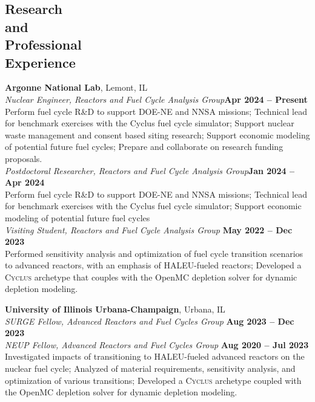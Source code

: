\documentclass[margin,line]{resume}
\newcommand{\Cyclus}{\textsc{Cyclus}\xspace}%
\begin{document}
\begin{resume}
    \section{\mysidestyle Research\\and\\Professional\\Experience}
    \textbf{Argonne National Lab}, Lemont, IL \vspace{1mm}\\
                \textsl{Nuclear Engineer, Reactors and Fuel Cycle Analysis Group}\hfill \textbf{Apr 2024 -- Present}\\
                Perform fuel cycle R\&D to support DOE-NE and NNSA missions; Technical lead for 
                benchmark exercises with 
                the Cyclus fuel cycle simulator; Support nuclear waste management and consent based 
                siting research; Support economic modeling of potential future 
                fuel cycles; Prepare and collaborate on research funding proposals. \vspace{2mm}\\                
                \textsl{Postdoctoral Researcher, Reactors and Fuel Cycle Analysis Group}\hfill \textbf{Jan 2024 -- Apr 2024}\\
                Perform fuel cycle R\&D to support DOE-NE and NNSA missions; Technical lead for 
                benchmark exercises with 
                the Cyclus fuel cycle simulator; Support economic modeling of potential future 
                fuel cycles\vspace{2mm}\\                
                \textsl{Visiting Student, Reactors and Fuel Cycle Analysis Group} \hfill \textbf{May 2022 -- Dec 2023}\\
                Performed sensitivity analysis and optimization of fuel cycle 
                transition scenarios to advanced reactors, with an emphasis of HALEU-fueled reactors; 
                Developed a \Cyclus archetype that couples with the OpenMC depletion 
                solver for dynamic depletion modeling. 

    \textbf{University of Illinois Urbana-Champaign}, Urbana, IL  \vspace{1mm}\\
                \textsl{SURGE Fellow, Advanced Reactors and Fuel Cycles Group} \hfill \textbf{Aug 2023 -- Dec 2023}\\
                \textsl{NEUP Fellow, Advanced Reactors and Fuel Cycles Group} \hfill \textbf{Aug 2020 -- Jul 2023}\\
                Investigated impacts of transitioning to HALEU-fueled advanced 
                reactors on the nuclear fuel cycle; Analyzed of material 
                requirements, sensitivity analysis, and optimization 
                of various transitions; Developed a \Cyclus archetype coupled
                with the OpenMC depletion solver for dynamic depletion modeling. 


\end{resume}
\end{document}
